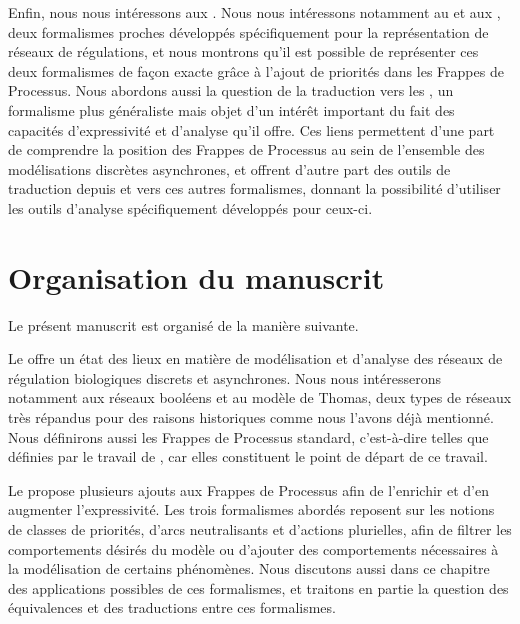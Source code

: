 Enfin, nous nous intéressons aux .
Nous nous intéressons notamment au  et aux ,
deux formalismes proches
développés spécifiquement pour la représentation de réseaux de régulations,
et nous montrons qu'il est possible de représenter ces deux formalismes de façon exacte
grâce à l'ajout de priorités dans les Frappes de Processus.
Nous abordons aussi la question de la traduction vers les ,
un formalisme plus généraliste mais objet d'un intérêt important du fait des
capacités d'expressivité et d'analyse qu'il offre. 
Ces liens permettent d'une part de comprendre la position des Frappes de Processus au sein
de l'ensemble des modélisations discrètes asynchrones,
et offrent d'autre part des outils de traduction depuis et vers ces autres formalismes,
donnant la possibilité d'utiliser les outils d'analyse spécifiquement développés pour ceux-ci.



\section{Organisation du manuscrit}

Le présent manuscrit est organisé de la manière suivante.

Le  offre un état des lieux en matière de modélisation et d'analyse
des réseaux de régulation biologiques discrets et asynchrones.
Nous nous intéresserons notamment aux réseaux booléens et au modèle de Thomas,
deux types de réseaux très répandus pour des raisons historiques
comme nous l'avons déjà mentionné.
Nous définirons aussi les Frappes de Processus standard,
c'est-à-dire telles que définies par le travail de ,
car elles constituent le point de départ de ce travail.

Le  propose plusieurs ajouts aux Frappes de Processus afin de l'enrichir
et d'en augmenter l'expressivité.
Les trois formalismes abordés reposent sur les notions de classes de priorités,
d'arcs neutralisants et d'actions plurielles,
afin de filtrer les comportements désirés du modèle
ou d'ajouter des comportements nécessaires à la modélisation de certains phénomènes.
Nous discutons aussi dans ce chapitre des applications possibles de ces formalismes,
et traitons en partie la question des équivalences et des traductions entre ces formalismes.

